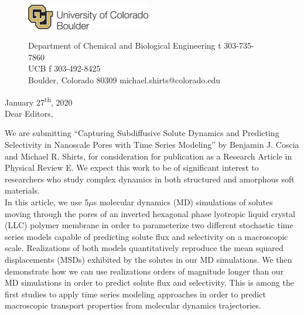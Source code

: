 \documentclass[fontsize=11pt]{article}
\begin{document}
	\graphicspath{{./figures/}}

	\begin{figure}
	\centering
	\begin{minipage}{0.37\textwidth}
	\includegraphics[width=2.14in,left]{CUBoulder.pdf}
	\end{minipage}
	\begin{minipage}{0.62\textwidth}
	\scriptsize
	\noindent Department of Chemical and Biological Engineering \hfill t 303-735-7860~~~~~~~~~~~~~~~~~~ \\
	 UCB \hfill f 303-492-8425~~~~~~~~~~~~~~~~~~ \\
	\noindent Boulder, Colorado 80309 \hfill michael.shirts@colorado.edu \\
	\end{minipage}
	\end{figure}
	
	\noindent January 27\textsuperscript{th}, 2020\\

	\noindent Dear Editors, \\
	
	\newcommand{\ManuscriptTitle}{Capturing Subdiffusive Solute Dynamics and 
	Predicting Selectivity in Nanoscale Pores with Time Series Modeling}
	
	We are submitting ``\ManuscriptTitle'' by Benjamin J. Coscia and
	Michael R.  Shirts, for consideration for publication as a Research
	Article in Physical Review E. We expect this work to be of significant
	interest to researchers who study complex dynamics in both structured
	and amorphous soft materials. \\
	
	In this article, we use 5$\mu$s molecular dynamics (MD) simulations of
	solutes moving through the pores of an inverted hexagonal phase
	lyotropic liquid crystal (LLC) polymer membrane in order to
	parameterize two different stochastic time series models capable of
	predicting solute flux and selectivity on a macroscopic scale.
	Realizations of both models quantitatively reproduce the mean squared
	displacements (MSDs) exhibited by the solutes in our MD simulations. We then
	demonstrate how we can use realizations orders of magnitude longer than
	our MD simulations in order to predict solute flux and selectivity.
	This is among the first studies to apply time series modeling
	approaches in order to predict 
        macroscopic transport properties from molecular dynamics trajectories.
\end{document}
